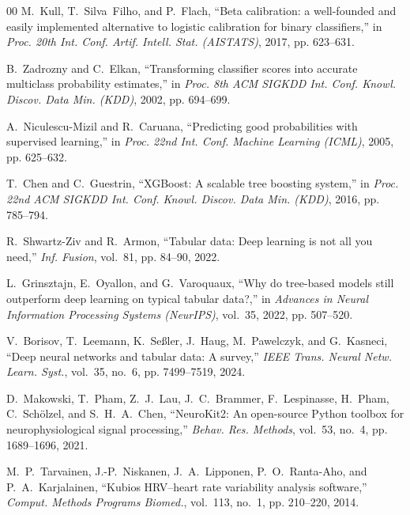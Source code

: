 \documentclass[conference]{IEEEtran}
\begin{document}
\begin{thebibliography}{00}
M.~Kull, T.~Silva~Filho, and P.~Flach, ``Beta calibration: a well-founded and easily implemented alternative to logistic calibration for binary classifiers,'' in \textit{Proc. 20th Int. Conf. Artif. Intell. Stat. (AISTATS)}, 2017, pp. 623--631.

B.~Zadrozny and C.~Elkan, ``Transforming classifier scores into accurate multiclass probability estimates,'' in \textit{Proc. 8th ACM SIGKDD Int. Conf. Knowl. Discov. Data Min. (KDD)}, 2002, pp. 694--699.

A.~Niculescu-Mizil and R.~Caruana, ``Predicting good probabilities with supervised learning,'' in \textit{Proc. 22nd Int. Conf. Machine Learning (ICML)}, 2005, pp. 625--632.

T.~Chen and C.~Guestrin, ``XGBoost: A scalable tree boosting system,'' in \textit{Proc. 22nd ACM SIGKDD Int. Conf. Knowl. Discov. Data Min. (KDD)}, 2016, pp. 785--794.

R.~Shwartz-Ziv and R.~Armon, ``Tabular data: Deep learning is not all you need,'' \textit{Inf. Fusion}, vol.~81, pp. 84--90, 2022.

L.~Grinsztajn, E.~Oyallon, and G.~Varoquaux, ``Why do tree-based models still outperform deep learning on typical tabular data?,'' in \textit{Advances in Neural Information Processing Systems (NeurIPS)}, vol.~35, 2022, pp. 507--520.

V.~Borisov, T.~Leemann, K.~Se\ss{}ler, J.~Haug, M.~Pawelczyk, and G.~Kasneci, ``Deep neural networks and tabular data: A survey,'' \textit{IEEE Trans. Neural Netw. Learn. Syst.}, vol.~35, no.~6, pp. 7499--7519, 2024.

D.~Makowski, T.~Pham, Z.~J.~Lau, J.~C.~Brammer, F.~Lespinasse, H.~Pham, C.~Sch\"olzel, and S.~H.~A.~Chen, ``NeuroKit2: An open-source Python toolbox for neurophysiological signal processing,'' \textit{Behav. Res. Methods}, vol.~53, no.~4, pp. 1689--1696, 2021.

M.~P.~Tarvainen, J.-P.~Niskanen, J.~A.~Lipponen, P.~O.~Ranta-Aho, and P.~A.~Karjalainen, ``Kubios HRV--heart rate variability analysis software,'' \textit{Comput. Methods Programs Biomed.}, vol.~113, no.~1, pp. 210--220, 2014.
\end{thebibliography}
\end{document}
